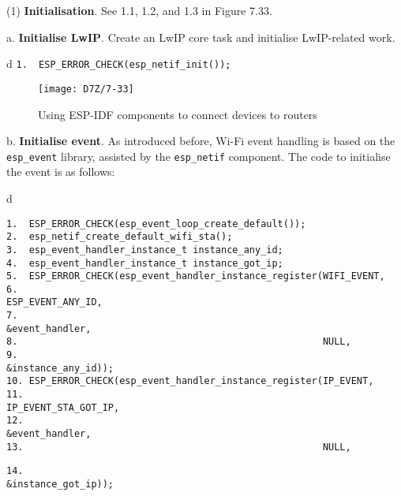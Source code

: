 \documentclass[a4paper,12pt]{book}
\begin{document}
(1) \textbf{Initialisation}. See 1.1, 1.2, and 1.3 in Figure 7.33.

a. \textbf{Initialise LwIP}. Create an LwIP core task and initialise LwIP-related work.
        
\begin{codebloc}
\begin{tabular}{d}
\verb|1.  ESP_ERROR_CHECK(esp_netif_init());|
\end{tabular}
\end{codebloc}

\newpage
{} %
\begin{figure}[!h]
    \centering
    \texttt{[image: D7Z/7-33]}
    \caption{Using ESP-IDF components to connect devices to routers}
\end{figure}

\restoregeometry %
        
b. \textbf{Initialise event}. As introduced before, Wi-Fi event handling is based on the \verb|esp_event| library, assisted by the \verb|esp_netif| component. The code to initialise the event is as follows:

\begin{codebloc}
\begin{tabular}{d}
\vspace{2pt}
\begin{verbatim}
1.  ESP_ERROR_CHECK(esp_event_loop_create_default());
2.  esp_netif_create_default_wifi_sta();
3.  esp_event_handler_instance_t instance_any_id;
4.  esp_event_handler_instance_t instance_got_ip;
5.  ESP_ERROR_CHECK(esp_event_handler_instance_register(WIFI_EVENT,
6.                                                      ESP_EVENT_ANY_ID,
7.                                                      &event_handler,
8.                                                      NULL,
9.                                                      &instance_any_id));
10. ESP_ERROR_CHECK(esp_event_handler_instance_register(IP_EVENT,
11.                                                     IP_EVENT_STA_GOT_IP,
12.                                                     &event_handler,
13.                                                     NULL,
\end{verbatim}
\verb|14.                                                     &instance_got_ip));|
\end{tabular}
\end{codebloc}
\end{document}
